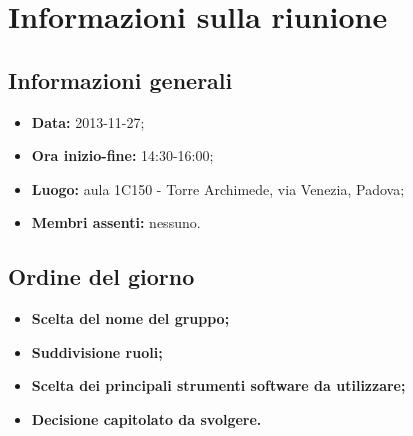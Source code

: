 \section{Informazioni sulla riunione}
\label{inforiunione}
\subsection{Informazioni generali}
\label{infogenerali}
\begin{itemize}
\item\textbf{Data:} 2013-11-27;
\item\textbf{Ora inizio-fine:} 14:30-16:00;
\item\textbf{Luogo:} aula 1C150 - Torre Archimede, via Venezia, Padova;
\item\textbf{Membri assenti:} nessuno.
\end{itemize}

\subsection{Ordine del giorno}
\label{odg}
\begin{itemize}
\item\textbf{Scelta del nome del gruppo;}
\item\textbf{Suddivisione ruoli;}
\item\textbf{Scelta dei principali strumenti software da utilizzare;}
\item\textbf{Decisione capitolato da svolgere.}
\end{itemize}